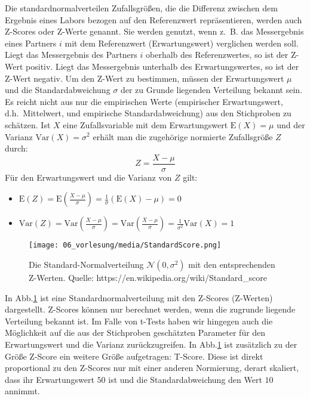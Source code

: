 Die standardnormalverteilen Zufallsgrößen, die die Differenz zwischen dem Ergebnis eines Labors bezogen auf den Referenzwert repräsentieren, werden auch Z-Scores oder Z-Werte genannt. Sie werden genutzt, wenn z.~B. das Messergebnis eines
Partners $i$ mit dem Referenzwert (Erwartungswert) verglichen werden soll.
Liegt das Messergebnis des Partners $i$ oberhalb des Referenzwertes, so ist der Z-Wert positiv.
Liegt das Messergebnis  unterhalb des Erwartungswertes, so ist der Z-Wert negativ.
Um den Z-Wert zu bestimmen, müssen der Erwartungswert $\mu$ und die
Standardabweichung $\sigma$ der zu Grunde liegenden Verteilung
bekannt sein. Es reicht nicht aus nur die empirischen Werte (empirischer Erwartungswert, d.h.\
Mittelwert, und empirische Standardabweichung) aus den Stichproben zu schätzen.
Ist $X$ eine Zufallsvariable mit dem Erwartungswert $\mathrm{E}(X)=\mu$ und
der Varianz $\mathrm{Var}(X) = \sigma^2$ erhält man die zugehörige normierte Zufallsgröße $Z$ durch:
\begin{equation}
Z=\frac{X-\mu}{\sigma}
\end{equation}
Für den Erwartungswert und die Varianz von $Z$ gilt:
\begin{itemize}
	\item $\mathrm{E}(Z) = \mathrm{E}\left( \frac{X-\mu}{\sigma} \right) =
	\frac{1}{\sigma} (\mathrm{E}(X) -\mu) = 0$
	\item $\mathrm{Var}(Z) = \mathrm{Var} \left(\frac{X-\mu}{\sigma} \right) =
	\mathrm{Var} \left(\frac{X-\mu}{\sigma} \right) =
	\frac{1}{\sigma^2} \mathrm{Var}(X) = 1$
\end{itemize}

\begin{figure}[!htp]
	\begin{center}
		\texttt{[image: 06\_vorlesung/media/StandardScore.png]}
		\caption{Die Standard-Normalverteilung $\mathcal{N}(0,\sigma^2)$ mit den entsprechenden Z-Werten.\newline
		Quelle: https://en.wikipedia.org/wiki/Standard\_score }
		\label{fig:StandardScore}
	\end{center}
\end{figure}
In Abb.\ref*{fig:StandardScore} ist eine Standardnormalverteilung mit den
Z-Scores (Z-Werten) dargestellt.
Z-Scores können nur berechnet werden, wenn die zugrunde liegende Verteilung bekannt ist.
Im Falle von t-Tests haben wir hingegen auch die Möglichkeit auf die aus der Stichproben
geschätzten Parameter für den Erwartungswert und die Varianz zurückzugreifen.
In Abb.\ref*{fig:StandardScore} ist zusätzlich zu der Größe Z-Score ein  weitere
Größe aufgetragen: T-Score. Diese ist direkt proportional zu den Z-Scores nur mit einer
anderen Normierung, derart skaliert, dass ihr Erwartungswert $50$ ist und die
Standardabweichung den Wert $10$ annimmt.

